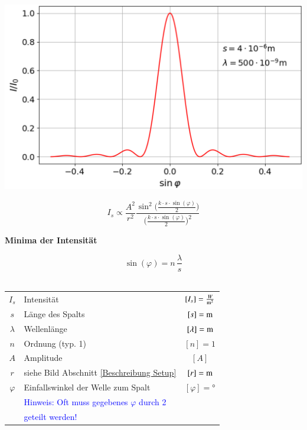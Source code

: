 \begin{minipage}{0.58\linewidth}
\includegraphics[width=0.98\linewidth]{Bilder/Wellen-Optik/beugung_spalt_intensitaet} \\
\end{minipage}
\hfill
\begin{minipage}{0.4\linewidth}
$$ \boxed{ I_s \varpropto \frac{A^2}{r^2} \frac{\sin^2\Big( \frac{k \cdot s \cdot \sin(\varphi)}{2} \Big) }{\Big( \frac{k \cdot s \cdot \sin(\varphi)}{2} \Big)^2 } } $$


\textbf{Minima der Intensität} 

$$ \boxed{ \sin(\varphi) = n \, \frac{\lambda}{s}} $$ \\
\end{minipage}



\renewcommand{\arraystretch}{1.1}
\begin{tabular}{clc}
$I_s$ & Intensität & $[I_s] = \frac{W}{\mathrm{m}^2}$ \\
$s$ & Länge des Spalts & $[s] = \mathrm{m}$ \\
$\lambda$ & Wellenlänge & $[\lambda]= \mathrm{m}$ \\
$n$ & Ordnung (typ. 1) & $[n] = 1$ \\
$A$ & Amplitude & $[A]$ \\
$r$ & siehe Bild Abschnitt \ref{Beschreibung Setup} & $[r] = \mathrm{m}$ \\
$\varphi$ & Einfallswinkel der Welle zum Spalt & $[\varphi] =$° \\
 & \textcolor{blue}{Hinweis: Oft muss gegebenes $\varphi$ durch 2} & \\
 & \textcolor{blue}{geteilt werden!} \\
\end{tabular}
\renewcommand{\arraystretch}{1}

